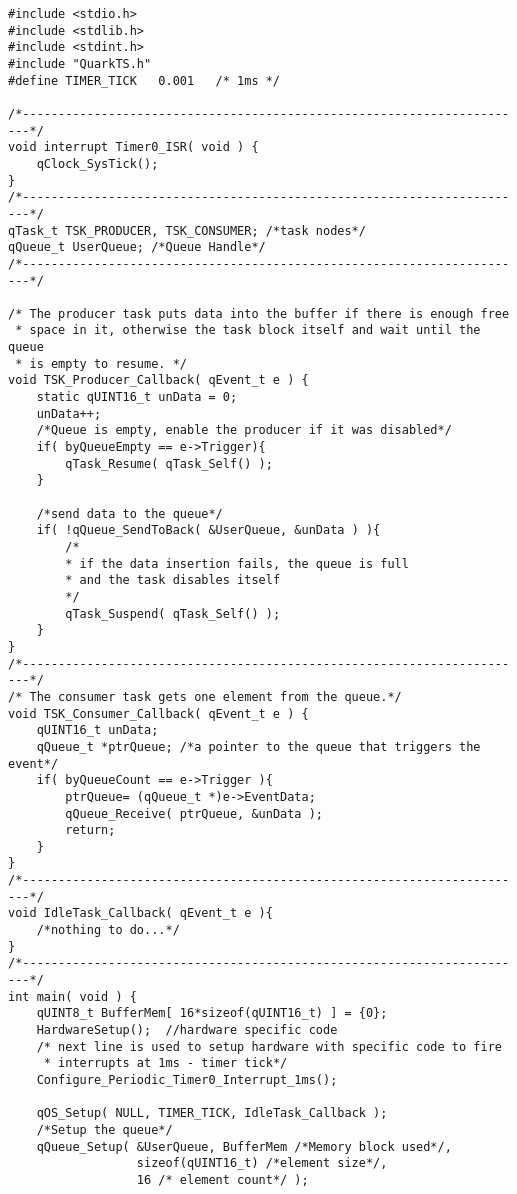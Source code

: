 \begin{lstlisting}[style=CStyle]
#include <stdio.h>
#include <stdlib.h>
#include <stdint.h>
#include "QuarkTS.h"
#define TIMER_TICK   0.001   /* 1ms */ 

/*-----------------------------------------------------------------------*/
void interrupt Timer0_ISR( void ) {
    qClock_SysTick();   
}
/*-----------------------------------------------------------------------*/
qTask_t TSK_PRODUCER, TSK_CONSUMER; /*task nodes*/
qQueue_t UserQueue; /*Queue Handle*/
/*-----------------------------------------------------------------------*/

/* The producer task puts data into the buffer if there is enough free 
 * space in it, otherwise the task block itself and wait until the queue 
 * is empty to resume. */
void TSK_Producer_Callback( qEvent_t e ) {
    static qUINT16_t unData = 0;
    unData++;	
    /*Queue is empty, enable the producer if it was disabled*/
    if( byQueueEmpty == e->Trigger){
        qTask_Resume( qTask_Self() );
    }

    /*send data to the queue*/
    if( !qQueue_SendToBack( &UserQueue, &unData ) ){ 
        /*
        * if the data insertion fails, the queue is full 
        * and the task disables itself
        */
	    qTask_Suspend( qTask_Self() ); 
    }
}
/*-----------------------------------------------------------------------*/
/* The consumer task gets one element from the queue.*/
void TSK_Consumer_Callback( qEvent_t e ) {
    qUINT16_t unData;
    qQueue_t *ptrQueue; /*a pointer to the queue that triggers the event*/
    if( byQueueCount == e->Trigger ){
	    ptrQueue= (qQueue_t *)e->EventData;
	    qQueue_Receive( ptrQueue, &unData );
	    return;
    }
}
/*-----------------------------------------------------------------------*/
void IdleTask_Callback( qEvent_t e ){
    /*nothing to do...*/
}	
/*-----------------------------------------------------------------------*/
int main( void ) {    
    qUINT8_t BufferMem[ 16*sizeof(qUINT16_t) ] = {0};  
    HardwareSetup();  //hardware specific code
    /* next line is used to setup hardware with specific code to fire
     * interrupts at 1ms - timer tick*/
    Configure_Periodic_Timer0_Interrupt_1ms();
 
    qOS_Setup( NULL, TIMER_TICK, IdleTask_Callback );     
    /*Setup the queue*/
    qQueue_Setup( &UserQueue, BufferMem /*Memory block used*/, 
                  sizeof(qUINT16_t) /*element size*/, 
                  16 /* element count*/ );     
                 

\end{lstlisting}
